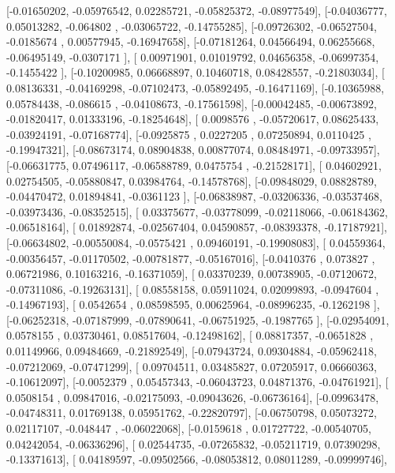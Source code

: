 \documentclass{article}
\begin{document}
       [-0.01650202, -0.05976542,  0.02285721, -0.05825372, -0.08977549],
       [-0.04036777,  0.05013282, -0.064802  , -0.03065722, -0.14755285],
       [-0.09726302, -0.06527504, -0.0185674 ,  0.00577945, -0.16947658],
       [-0.07181264,  0.04566494,  0.06255668, -0.06495149, -0.0307171 ],
       [ 0.00971901,  0.01019792,  0.04656358, -0.06997354, -0.1455422 ],
       [-0.10200985,  0.06668897,  0.10460718,  0.08428557, -0.21803034],
       [ 0.08136331, -0.04169298, -0.07102473, -0.05892495, -0.16471169],
       [-0.10365988,  0.05784438, -0.086615  , -0.04108673, -0.17561598],
       [-0.00042485, -0.00673892, -0.01820417,  0.01333196, -0.18254648],
       [ 0.0098576 , -0.05720617,  0.08625433, -0.03924191, -0.07168774],
       [-0.0925875 ,  0.0227205 ,  0.07250894,  0.0110425 , -0.19947321],
       [-0.08673174,  0.08904838,  0.00877074,  0.08484971, -0.09733957],
       [-0.06631775,  0.07496117, -0.06588789,  0.0475754 , -0.21528171],
       [ 0.04602921,  0.02754505, -0.05880847,  0.03984764, -0.14578768],
       [-0.09848029,  0.08828789, -0.04470472,  0.01894841, -0.0361123 ],
       [-0.06838987, -0.03206336, -0.03537468, -0.03973436, -0.08352515],
       [ 0.03375677, -0.03778099, -0.02118066, -0.06184362, -0.06518164],
       [ 0.01892874, -0.02567404,  0.04590857, -0.08393378, -0.17187921],
       [-0.06634802, -0.00550084, -0.0575421 ,  0.09460191, -0.19908083],
       [ 0.04559364, -0.00356457, -0.01170502, -0.00781877, -0.05167016],
       [-0.0410376 ,  0.073827  ,  0.06721986,  0.10163216, -0.16371059],
       [ 0.03370239,  0.00738905, -0.07120672, -0.07311086, -0.19263131],
       [ 0.08558158,  0.05911024,  0.02099893, -0.0947604 , -0.14967193],
       [ 0.0542654 ,  0.08598595,  0.00625964, -0.08996235, -0.1262198 ],
       [-0.06252318, -0.07187999, -0.07890641, -0.06751925, -0.1987765 ],
       [-0.02954091,  0.0578155 ,  0.03730461,  0.08517604, -0.12498162],
       [ 0.08817357, -0.0651828 ,  0.01149966,  0.09484669, -0.21892549],
       [-0.07943724,  0.09304884, -0.05962418, -0.07212069, -0.07471299],
       [ 0.09704511,  0.03485827,  0.07205917,  0.06660363, -0.10612097],
       [-0.0052379 ,  0.05457343, -0.06043723,  0.04871376, -0.04761921],
       [ 0.0508154 ,  0.09847016, -0.02175093, -0.09043626, -0.06736164],
       [-0.09963478, -0.04748311,  0.01769138,  0.05951762, -0.22820797],
       [-0.06750798,  0.05073272,  0.02117107, -0.048447  , -0.06022068],
       [-0.0159618 ,  0.01727722, -0.00540705,  0.04242054, -0.06336296],
       [ 0.02544735, -0.07265832, -0.05211719,  0.07390298, -0.13371613],
       [ 0.04189597, -0.09502566, -0.08053812,  0.08011289, -0.09999746],
\end{document}
